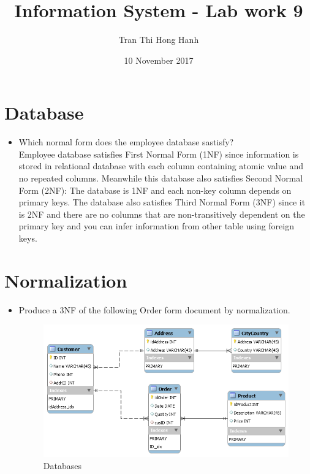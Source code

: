 \documentclass{article}
\title{Information System - Lab work 9}
\author{Tran Thi Hong Hanh}
\date{10 November 2017}
\begin{document}
\maketitle
\section*{Database}

\begin{itemize}
	\item Which normal form does the employee database sastisfy?\\
Employee database satisfies	First Normal Form (1NF) since information is stored in relational database with each column containing atomic value and no repeated columns. 
Meanwhile this database also satisfies Second Normal Form (2NF): The database is 1NF and each non-key column depends on primary keys.
The database also satisfies Third Normal Form (3NF) since it is 2NF and there are no columns that are non-transitively dependent on the primary key and you can infer information from other table using foreign keys.

\end{itemize}

\section*{Normalization}
\begin{itemize}
	\item Produce a 3NF of the following Order form document by normalization.
\begin{figure}[h]
\centering
\includegraphics[scale = 0.5]{schema.PNG}
\caption{Databases}
\end{figure}
\end{itemize}
\end{document}
